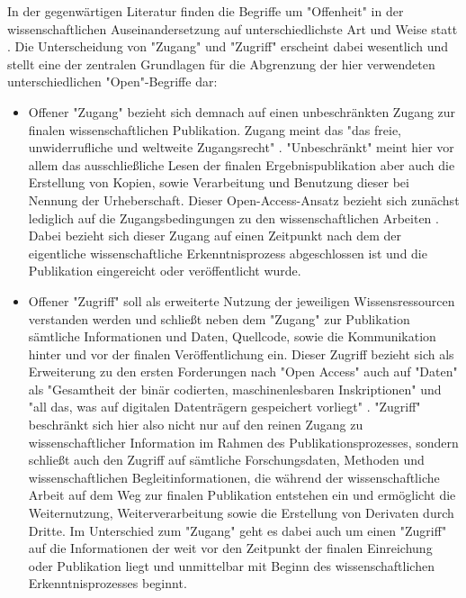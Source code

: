 In der gegenwärtigen Literatur finden die Begriffe um "Offenheit" in der wissenschaftlichen Auseinandersetzung auf unterschiedlichste Art und Weise statt \cite{cite:9}. Die Unterscheidung von "Zugang" und "Zugriff" erscheint dabei wesentlich und stellt eine der zentralen Grundlagen für die Abgrenzung der hier verwendeten unterschiedlichen "Open"-Begriffe dar:
\begin{itemize}
\item Offener "Zugang" bezieht sich demnach auf einen unbeschränkten Zugang zur finalen wissenschaftlichen Publikation. Zugang meint das "das freie, unwiderrufliche und
weltweite Zugangsrecht" \cite{berliner_erklaerung_2003}. "Unbeschränkt" meint hier vor allem das ausschließliche Lesen der finalen Ergebnispublikation aber auch die Erstellung von Kopien, sowie Verarbeitung und Benutzung dieser \cite{Lossau_oa_2007} bei Nennung der Urheberschaft. Dieser Open-Access-Ansatz bezieht sich zunächst lediglich auf die Zugangsbedingungen zu den wissenschaftlichen Arbeiten \cite{muller_2010_open}. Dabei bezieht sich dieser Zugang auf einen Zeitpunkt nach dem der eigentliche wissenschaftliche Erkenntnisprozess abgeschlossen ist und die Publikation eingereicht oder veröffentlicht wurde.
\item Offener "Zugriff" soll als erweiterte Nutzung der jeweiligen Wissensressourcen verstanden werden und schließt neben dem "Zugang" zur Publikation sämtliche Informationen und Daten, Quellcode, sowie die Kommunikation hinter und vor der finalen Veröffentlichung \cite{hey_2015_open} ein. Dieser Zugriff bezieht sich als Erweiterung zu den ersten Forderungen nach "Open Access" auch auf "Daten" als "Gesamtheit der binär codierten, maschinenlesbaren Inskriptionen" und "all das, was auf digitalen Datenträgern gespeichert vorliegt" \cite{Burkhardt_2015}. "Zugriff" beschränkt sich hier also nicht nur auf den reinen Zugang zu wissenschaftlicher Information im Rahmen des Publikationsprozesses, sondern schließt auch den Zugriff auf sämtliche Forschungsdaten, Methoden und wissenschaftlichen Begleitinformationen, die während der wissenschaftliche Arbeit auf dem Weg zur finalen Publikation entstehen ein und ermöglicht die Weiternutzung, Weiterverarbeitung sowie die Erstellung von Derivaten durch Dritte. Im Unterschied zum "Zugang" geht es dabei auch um einen "Zugriff" auf die Informationen der weit vor den Zeitpunkt der finalen Einreichung oder Publikation liegt und unmittelbar mit Beginn des wissenschaftlichen Erkenntnisprozesses beginnt.
\end{itemize}

